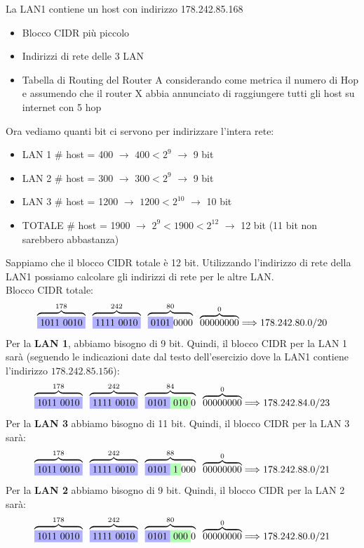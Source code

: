 \documentclass[a4paper]{article}
\begin{document}
La LAN1 contiene un host con indirizzo 178.242.85.168

\begin{itemize}
    \item Blocco CIDR più piccolo
    \item Indirizzi di rete delle 3 LAN
    \item Tabella di Routing del Router A considerando come metrica il numero di Hop
    e assumendo che il router X abbia annunciato di raggiungere tutti gli host su internet con 5 hop
\end{itemize}
Ora vediamo quanti bit ci servono per indirizzare l'intera rete:
\begin{itemize}
    \item LAN 1 \# host = 400 $\rightarrow$ $400 < 2^9$ $\rightarrow$ 9 bit
    \item LAN 2 \# host = 300 $\rightarrow$ $300< 2^9$ $\rightarrow$ 9 bit
    \item LAN 3 \# host = 1200 $\rightarrow$ $1200 < 2^{10}$ $\rightarrow$ 10 bit
    \item TOTALE \# host = 1900 $\rightarrow$ $2^9 < 1900 < 2^{12}$ $\rightarrow$ 12 bit (11 bit non sarebbero abbastanza)
\end{itemize}
Sappiamo che il blocco CIDR totale è 12 bit. Utilizzando l'indirizzo di rete della LAN1 possiamo calcolare gli indirizzi di rete per le altre LAN.
\\
Blocco CIDR totale:
\[\overbrace{\colorbox{blue!30!white}{1011 0010}}^{178} \; \; \overbrace{\colorbox{blue!30!white}{1111 0010}}^{242} \; \; \overbrace{\colorbox{blue!30!white}{0101}0000}^{80} \; \; \overbrace{00000000}^{0} \Longrightarrow 178.242.80.0/20\]
Per la \textbf{LAN 1}, abbiamo bisogno di 9 bit. Quindi, il blocco CIDR per la LAN 1 sarà (seguendo le indicazioni date dal testo dell'esercizio dove la LAN1 contiene l'indirizzo $178.242.85.156$):
\[\overbrace{\colorbox{blue!30!white}{1011 0010}}^{178} \; \; \overbrace{\colorbox{blue!30!white}{1111 0010}}^{242} \; \; \overbrace{\colorbox{blue!30!white}{0101}\colorbox{green!30!white}{010}0}^{84} \; \; \overbrace{00000000}^{0} \Longrightarrow 178.242.84.0/23\]
Per la \textbf{LAN 3} abbiamo bisogno di 11 bit. Quindi, il blocco CIDR per la LAN 3 sarà:
\[\overbrace{\colorbox{blue!30!white}{1011 0010}}^{178} \; \; \overbrace{\colorbox{blue!30!white}{1111 0010}}^{242} \; \; \overbrace{\colorbox{blue!30!white}{0101}\colorbox{green!30!white}{1}000}^{88} \; \; \overbrace{00000000}^{0} \Longrightarrow 178.242.88.0/21\]
Per la \textbf{LAN 2} abbiamo bisogno di 9 bit. Quindi, il blocco CIDR per la LAN 2 sarà:
\[\overbrace{\colorbox{blue!30!white}{1011 0010}}^{178} \; \; \overbrace{\colorbox{blue!30!white}{1111 0010}}^{242} \; \; \overbrace{\colorbox{blue!30!white}{0101}\colorbox{green!30!white}{000}0}^{80} \; \; \overbrace{00000000}^{0} \Longrightarrow 178.242.80.0/21\]
\end{document}
